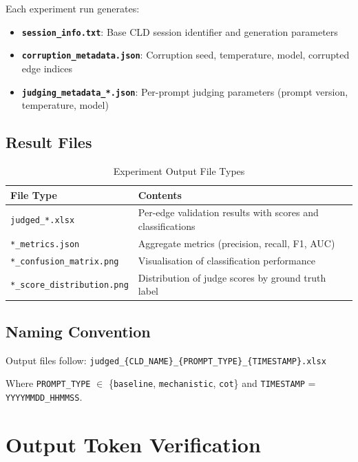 Each experiment run generates:
\begin{itemize}[noitemsep]
    \item \textbf{\texttt{session\_info.txt}}: Base CLD session identifier and generation parameters
    \item \textbf{\texttt{corruption\_metadata.json}}: Corruption seed, temperature, model, corrupted edge indices
    \item \textbf{\texttt{judging\_metadata\_*.json}}: Per-prompt judging parameters (prompt version, temperature, model)
\end{itemize}

\subsection{Result Files}

\begin{table}[H]
\centering
\caption{Experiment Output File Types}
\label{tab:output_files}
\footnotesize
\begin{tabular}{@{}ll@{}}
\toprule
\textbf{File Type} & \textbf{Contents} \\
\midrule
\texttt{judged\_*.xlsx} & Per-edge validation results with scores and classifications \\
\texttt{*\_metrics.json} & Aggregate metrics (precision, recall, F1, AUC) \\
\texttt{*\_confusion\_matrix.png} & Visualisation of classification performance \\
\texttt{*\_score\_distribution.png} & Distribution of judge scores by ground truth label \\
\bottomrule
\end{tabular}
\end{table}

\subsection{Naming Convention}

Output files follow: \texttt{judged\_\{CLD\_NAME\}\_\{PROMPT\_TYPE\}\_\{TIMESTAMP\}.xlsx}

Where \texttt{PROMPT\_TYPE} $\in$ \{\texttt{baseline}, \texttt{mechanistic}, \texttt{cot}\} and \texttt{TIMESTAMP} = \texttt{YYYYMMDD\_HHMMSS}.

\section{Output Token Verification}
\label{sec:token_verification}

